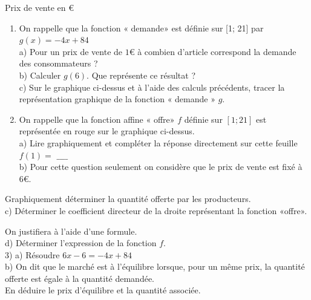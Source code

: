 \documentclass[10pt]{article}
\begin{document}
Prix de vente en €

\begin{enumerate}
  \item On rappelle que la fonction « demande» est définie sur [1; 21] par $g(x)=-4 x+84$\\
a) Pour un prix de vente de $1 €$ à combien d'article correspond la demande des consommateurs ?\\
b) Calculer $g(6)$. Que représente ce résultat ?\\
c) Sur le graphique ci-dessus et à l'aide des calculs précédents, tracer la représentation graphique de la fonction « demande » $g$.
  \item On rappelle que la fonction affine « offre» $f$ définie sur $[1 ; 21]$ est représentée en rouge sur le graphique ci-dessus.\\
a) Lire graphiquement et compléter la réponse directement sur cette feuille $f(1)=$ $\_\_\_\_$\\
b) Pour cette question seulement on considère que le prix de vente est fixé à $6 €$.
\end{enumerate}

Graphiquement déterminer la quantité offerte par les producteurs.\\
c) Déterminer le coefficient directeur de la droite représentant la fonction «offre».

On justifiera à l'aide d'une formule.\\
d) Déterminer l'expression de la fonction $f$.\\
3) a) Résoudre $6 x-6=-4 x+84$\\
b) On dit que le marché est à l'équilibre lorsque, pour un même prix, la quantité offerte est égale à la quantité demandée.\\
En déduire le prix d'équilibre et la quantité associée.
\end{document}
